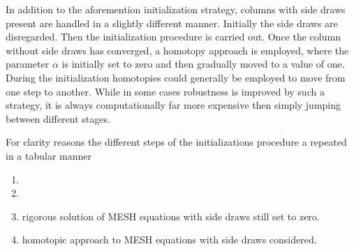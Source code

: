         In addition to the aforemention initialization strategy, columns with side draws present are handled
        in a slightly different manner. Initially the side draws are disregarded. Then the initialization procedure
        is carried out. Once the column without side draws has converged, a homotopy approach
        is employed, where the parameter $\alpha$ is initially set to zero and then gradually moved to a value
        of one.  During the initialization homotopies could
        generally be employed to move from one step to another. While in some cases robustness is improved by
        such a strategy, it is always computationally far more expensive then simply jumping between different
        stages.

        For clarity reasons the different steps of the initializations procedure a repeated in a tabular manner

        \begin{enumerate}
            \item {}
            \item {}
            \item rigorous solution of MESH equations with side draws still set to zero.
            \item homotopic approach to MESH equations with side draws considered.
        \end{enumerate}

